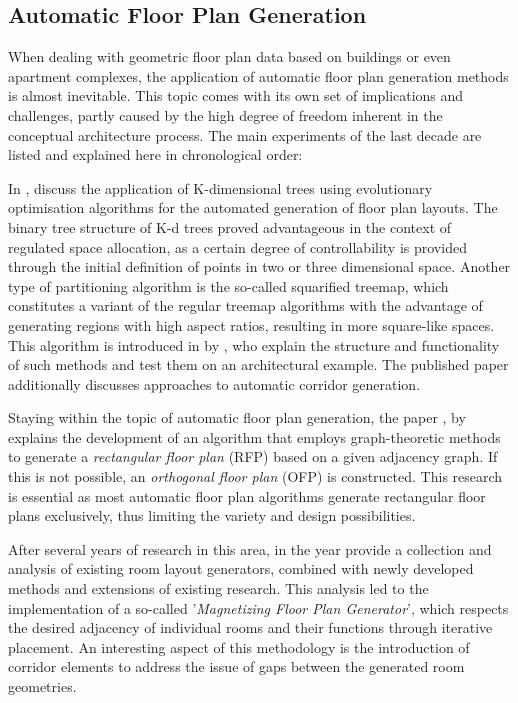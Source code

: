 \documentclass[a4paper, 12pt]{report}
\begin{document}
\subsection{Automatic Floor Plan Generation}\label{subsec:automatic-floor-plan-generation}

When dealing with geometric floor plan data based on buildings or even apartment complexes, the application of automatic floor plan generation methods is almost inevitable. This topic comes with its own set of implications and challenges, partly caused by the high degree of freedom inherent in the conceptual architecture process. The main experiments of the last decade are listed and explained here in chronological order:

In \citeyear{knecht2010generating}, \citeauthor{knecht2010generating} discuss the application of K-dimensional trees using evolutionary optimisation algorithms for the automated generation of floor plan layouts. The \gls{binary tree} structure of K-d trees proved advantageous in the context of regulated space allocation, as a certain degree of controllability is provided through the initial definition of points in two or three dimensional space. Another type of partitioning algorithm is the so-called squarified treemap, which constitutes a variant of the regular treemap algorithms with the advantage of generating regions with high aspect ratios, resulting in more square-like spaces. This algorithm is introduced in  by \citeauthor{marson2010automatic}, who explain the structure and functionality of such methods and test them on an architectural example. The published paper additionally discusses approaches to automatic corridor generation.

Staying within the topic of automatic floor plan generation, the paper , by \citeauthor{shekhawat2019graph} explains the development of an algorithm that employs graph-theoretic methods to generate a \textit{rectangular floor plan} (RFP) based on a given adjacency graph. If this is not possible, an \textit{orthogonal floor plan} (OFP) is constructed. This research is essential as most automatic floor plan algorithms generate rectangular floor plans exclusively, thus limiting the variety and design possibilities.

After several years of research in this area, \citeauthor{egor2020computer} in the year \citeyear{egor2020computer} provide a collection and analysis of existing room layout generators, combined with newly developed methods and extensions of existing research. This analysis led to the implementation of a so-called '\textit{Magnetizing Floor Plan Generator}', which respects the desired adjacency of individual rooms and their functions through iterative placement. An interesting aspect of this methodology is the introduction of corridor elements to address the issue of gaps between the generated room geometries.
\end{document}
